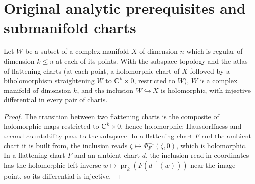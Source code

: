 \section{Original analytic prerequisites and submanifold charts}

\begin{lemma}
\label{ana:submanifold-complex-structure}
\mixedleanok
Let \(W\) be a subset of a complex manifold \(X\) of dimension \(n\) which is regular of
dimension \(k\le n\) at each of its points. With the subspace topology and the atlas of
flattening charts (at each point, a holomorphic chart of \(X\) followed by a biholomorphism
straightening \(W\) to \(\mathbf C^k\times0\), restricted to \(W\)), \(W\) is a complex manifold
of dimension \(k\), and the inclusion \(W\hookrightarrow X\) is holomorphic, with injective
differential in every pair of charts.
\end{lemma}
\begin{proof}
\mixedleanok
The transition between two flattening charts is the composite of holomorphic maps restricted
to \(\mathbf C^k\times0\), hence holomorphic; Hausdorffness and second countability pass to
the subspace. In a flattening chart \(F\) and the ambient chart it is built from, the inclusion
reads \(\zeta\mapsto\Phi_F^{-1}(\zeta,0)\), which is holomorphic. In a flattening chart \(F\) and an
ambient chart \(d\), the inclusion read in coordinates has the holomorphic left inverse \(w\mapsto\operatorname{pr}_k(F(d^{-1}(w)))\)
near the image point, so its differential is injective.
\end{proof}

